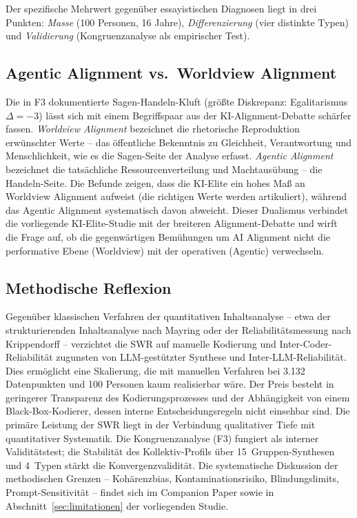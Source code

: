 \documentclass[12pt,a4paper]{article}
\begin{document}
Der spezifische Mehrwert gegen\"uber essayistischen Diagnosen liegt in drei Punkten: \emph{Masse} (100 Personen, 16 Jahre), \emph{Differenzierung} (vier distinkte Typen) und \emph{Validierung} (Kongruenzanalyse als empirischer Test).


\subsection{Agentic Alignment vs.\ Worldview Alignment}
\label{sec:diskussion:alignment}

Die in F3 dokumentierte Sagen-Handeln-Kluft (gr\"o\ss{}te Diskrepanz: Egalitarismus $\Delta = -3$) l\"asst sich mit einem Begriffspaar aus der KI-Alignment-Debatte sch\"arfer fassen. \emph{Worldview Alignment} bezeichnet die rhetorische Reproduktion erw\"unschter Werte -- das \"offentliche Bekenntnis zu Gleichheit, Verantwortung und Menschlichkeit, wie es die \glqq Sagen\grqq-Seite der Analyse erfasst. \emph{Agentic Alignment} bezeichnet die tats\"achliche Ressourcenverteilung und Macht\-aus\"ubung -- die \glqq Handeln\grqq-Seite. Die Befunde zeigen, dass die KI-Elite ein hohes Ma\ss{} an Worldview Alignment aufweist (die \glqq richtigen\grqq{} Werte werden artikuliert), w\"ahrend das Agentic Alignment systematisch davon abweicht. Dieser Dualismus verbindet die vorliegende KI-Elite-Studie mit der breiteren Alignment-Debatte und wirft die Frage auf, ob die gegenw\"artigen Bem\"uhungen um \glqq AI Alignment\grqq{} nicht die performative Ebene (Worldview) mit der operativen (Agentic) verwechseln.


\subsection{Methodische Reflexion}
\label{sec:diskussion:methodik}

Gegen\"uber klassischen Verfahren der quantitativen Inhaltsanalyse -- etwa der strukturierenden Inhaltsanalyse nach Mayring oder der Reliabilit\"atsmessung nach Krippendorff -- verzichtet die SWR auf manuelle Kodierung und Inter-Coder-Reliabilit\"at zugunsten von LLM-gest\"utzter Synthese und Inter-LLM-Reliabilit\"at. Dies erm\"oglicht eine Skalierung, die mit manuellen Verfahren bei 3.132 Datenpunkten und 100 Personen kaum realisierbar w\"are. Der Preis besteht in geringerer Transparenz des Kodierungsprozesses und der Abh\"angigkeit von einem \glqq Black-Box\grqq-Kodierer, dessen interne Entscheidungsregeln nicht einsehbar sind. Die prim\"are Leistung der SWR liegt in der Verbindung qualitativer Tiefe mit quantitativer Systematik. Die Kongruenzanalyse (F3) fungiert als interner Validit\"atstest; die Stabilit\"at des Kollektiv-Profils \"uber 15~Gruppen-Synthesen und 4~Typen st\"arkt die Konvergenzvalidit\"at. Die systematische Diskussion der methodischen Grenzen -- Koh\"arenzbias, Kontaminationsrisiko, Blindungslimits, Prompt-Sensitivit\"at -- findet sich im Companion Paper \citep{Geiger2026SWR} sowie in Abschnitt~\ref{sec:limitationen} der vorliegenden Studie.
\end{document}
